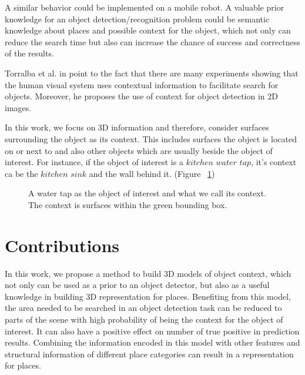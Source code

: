 A similar behavior could be implemented on a mobile robot. 
A valuable prior knowledge for an object detection/recognition problem could be semantic knowledge about places and possible context for the object, 
which not only can reduce the search time but also can increase the chance of success and correctness of the results.

Torralba et al. in \cite{eyeMovement} point to the fact that there are many experiments showing that the human visual system uses 
contextual information to facilitate search for objects. 
Moreover, he proposes the use of context for object detection in 2D images.

In this work, we focus on 3D information and therefore, consider surfaces surrounding the object as its context.
This includes surfaces the object is located on or next to and also other objects which are usually
beside the object of interest. 
For instance, if the object of interest is a $kitchen$ $water$ $tap$, it's context ca be the 
$kitchen$ $sink$ and the wall behind it. (Figure ~\ref{contextExample.figure})

\begin{figure}[t]
  \caption[Illustration of a sample Context.]
  {A water tap as the object of interest and what we call its context. The context is surfaces within the green 
  bounding box.}
  \label{contextExample.figure}
\end{figure}

\section {Contributions}
\label{Contributions.sec}

In this work, we propose a method to build 3D models of object context, which not only can be used as a prior to an object detector,
but also as a useful knowledge in building 3D representation for places. 
Benefiting from this model, the area needed to be searched in an object detection task can be reduced to parts of the scene with high 
probability of being the context for the object of interest. 
It can also have a positive effect on number of true positive in prediction results. 
Combining the information encoded in this model with other features and structural information of different place categories can 
result in a representation for places.
 
